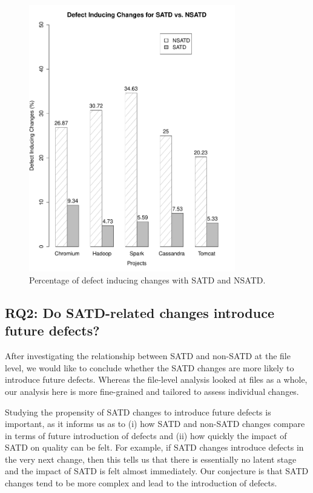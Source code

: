 \begin{figure}[tb!]
	\centering
	\includegraphics[width=90mm]{figures/chapter3/bug_inducing_changes}
	\caption{Percentage of defect inducing changes with SATD and NSATD.}
	\label{figure:bug_inducing_changes}
\end{figure}

\subsection*{RQ2: Do SATD-related changes introduce future defects?}

 After investigating the relationship between SATD and non-SATD at the file level, we would like to conclude whether the SATD changes are more likely to introduce future defects. Whereas the file-level analysis looked at files as a whole, our analysis here is more fine-grained and tailored to assess individual changes.

Studying the propensity of SATD changes to introduce future defects is important, as it informs us as to (i) how SATD and non-SATD changes compare in terms of future introduction of defects and (ii) how quickly the impact of SATD on quality can be felt. For example, if SATD changes introduce defects in the very next change, then this tells us that there is essentially no latent stage and the impact of SATD is felt almost immediately. Our conjecture is that SATD changes tend to be more complex and lead to the introduction of defects.


